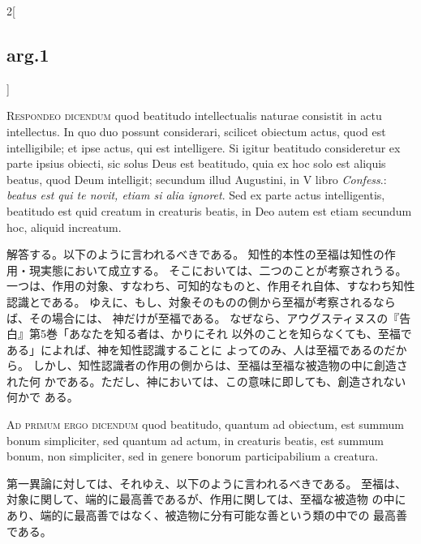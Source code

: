 \documentclass[paper=a4paper,fontsize=10pt,jafontsize=9pt,titlepage]{jlreq}
\begin{document}
\begin{paracol}{2}[\subsection{arg.1}]

{\scshape Respondeo dicendum} quod beatitudo intellectualis naturae consistit in
actu intellectus. In quo duo possunt considerari, scilicet obiectum
actus, quod est intelligibile; et ipse actus, qui est intelligere. Si
igitur beatitudo consideretur ex parte ipsius obiecti, sic solus Deus
est beatitudo, quia ex hoc solo est aliquis beatus, quod Deum
intelligit; secundum illud Augustini, in V libro {\itshape Confess}.: {\itshape beatus est
qui te novit, etiam si alia ignoret}. Sed ex parte actus intelligentis,
beatitudo est quid creatum in creaturis beatis, in Deo autem est etiam
secundum hoc, aliquid increatum.

\switchcolumn

解答する。以下のように言われるべきである。
知性的本性の至福は知性の作用・現実態において成立する。
そこにおいては、二つのことが考察されうる。
一つは、作用の対象、すなわち、可知的なものと、作用それ自体、すなわち知性
 認識とである。
ゆえに、もし、対象そのものの側から至福が考察されるならば、その場合には、
 神だけが至福である。
なぜなら、アウグスティヌスの『告白』第5巻「あなたを知る者は、かりにそれ
 以外のことを知らなくても、至福である」によれば、神を知性認識することに
 よってのみ、人は至福であるのだから。
しかし、知性認識者の作用の側からは、至福は至福な被造物の中に創造された何
 かである。ただし、神においては、この意味に即しても、創造されない何かで
 ある。

\switchcolumn*[\subsection{ad.1}]

{\scshape Ad primum ergo dicendum} quod beatitudo, quantum ad obiectum, est summum
bonum simpliciter, sed quantum ad actum, in creaturis beatis, est summum
bonum, non simpliciter, sed in genere bonorum participabilium a
creatura.

\switchcolumn

第一異論に対しては、それゆえ、以下のように言われるべきである。
至福は、対象に関して、端的に最高善であるが、作用に関しては、至福な被造物
 の中にあり、端的に最高善ではなく、被造物に分有可能な善という類の中での
 最高善である。

\switchcolumn*[\subsection{ad.2}]


\end{paracol}
\end{document}
